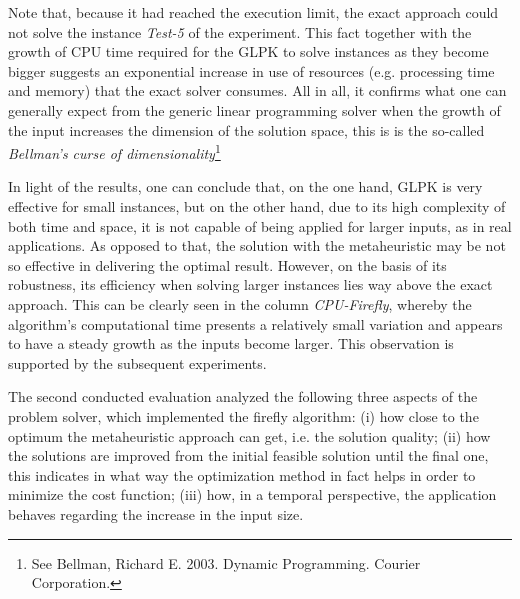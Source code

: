 \documentclass[tuberlin,cic,tc,openright,english,noabntcite,oneside]{iiufrgs}
\begin{document}
Note that, because it had reached the execution limit, the exact approach could not solve the instance \emph{Test-5} of the experiment. This fact together with the growth of CPU time required for the GLPK to solve instances as they become bigger suggests an exponential increase in use of resources (e.g. processing time and memory) that the exact solver consumes. All in all, it confirms what one can generally expect from the generic linear programming solver when the growth of the input increases the dimension of the solution space, this is is the so-called \emph{Bellman’s curse of dimensionality}\footnote{See Bellman, Richard E. 2003. Dynamic Programming.  Courier Corporation.}

In light of the results, one can conclude that, on the one hand, GLPK is very effective for small instances, but on the other hand, due to its high complexity of both time and space, it is not capable of being applied for larger inputs, as in real applications. As opposed to that, the solution with the metaheuristic may be not so effective in delivering the optimal result. However, on the basis of its robustness, its efficiency when solving larger instances lies way above the exact approach. This can be clearly seen in the column \emph{CPU-Firefly}, whereby the algorithm's computational time presents a relatively small variation and appears to have a steady growth as the inputs become larger. This observation is supported by the subsequent experiments.

The second conducted evaluation analyzed the following three aspects of the problem solver, which implemented the firefly algorithm: (i) how close to the optimum the metaheuristic approach can get, i.e. the solution quality; (ii) how the solutions are improved from the initial feasible solution until the final one, this indicates in what way the optimization method in fact helps in order to minimize the cost function; (iii) how, in a temporal perspective, the application behaves regarding the increase in the input size.
\end{document}
